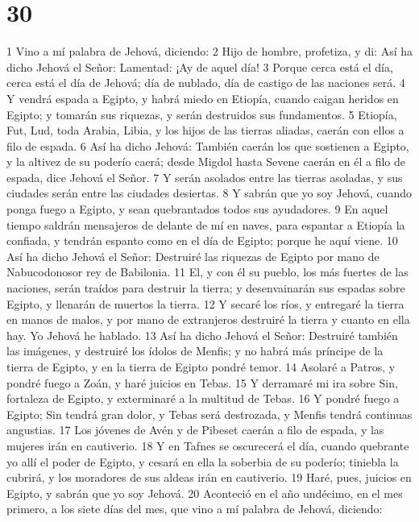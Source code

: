 \chapter{30}

1 Vino a mí palabra de Jehová, diciendo:
2 Hijo de hombre, profetiza, y di: Así ha dicho Jehová el Señor: Lamentad: ¡Ay de aquel día!
3 Porque cerca está el día, cerca está el día de Jehová; día de nublado, día de castigo de las naciones será.
4 Y vendrá espada a Egipto, y habrá miedo en Etiopía, cuando caigan heridos en Egipto; y tomarán sus riquezas, y serán destruidos sus fundamentos.
5 Etiopía, Fut, Lud, toda Arabia, Libia, y los hijos de las tierras aliadas, caerán con ellos a filo de espada.
6 Así ha dicho Jehová: También caerán los que sostienen a Egipto, y la altivez de su poderío caerá; desde Migdol hasta Sevene caerán en él a filo de espada, dice Jehová el Señor.
7 Y serán asolados entre las tierras asoladas, y sus ciudades serán entre las ciudades desiertas.
8 Y sabrán que yo soy Jehová, cuando ponga fuego a Egipto, y sean quebrantados todos sus ayudadores.
9 En aquel tiempo saldrán mensajeros de delante de mí en naves, para espantar a Etiopía la confiada, y tendrán espanto como en el día de Egipto; porque he aquí viene.
10 Así ha dicho Jehová el Señor: Destruiré las riquezas de Egipto por mano de Nabucodonosor rey de Babilonia.
11 El, y con él su pueblo, los más fuertes de las naciones, serán traídos para destruir la tierra; y desenvainarán sus espadas sobre Egipto, y llenarán de muertos la tierra.
12 Y secaré los ríos, y entregaré la tierra en manos de malos, y por mano de extranjeros destruiré la tierra y cuanto en ella hay. Yo Jehová he hablado.
13 Así ha dicho Jehová el Señor: Destruiré también las imágenes, y destruiré los ídolos de Menfis; y no habrá más príncipe de la tierra de Egipto, y en la tierra de Egipto pondré temor.
14 Asolaré a Patros, y pondré fuego a Zoán, y haré juicios en Tebas.
15 Y derramaré mi ira sobre Sin, fortaleza de Egipto, y exterminaré a la multitud de Tebas.
16 Y pondré fuego a Egipto; Sin tendrá gran dolor, y Tebas será destrozada, y Menfis tendrá continuas angustias.
17 Los jóvenes de Avén y de Pibeset caerán a filo de espada, y las mujeres irán en cautiverio.
18 Y en Tafnes se oscurecerá el día, cuando quebrante yo allí el poder de Egipto, y cesará en ella la soberbia de su poderío; tiniebla la cubrirá, y los moradores de sus aldeas irán en cautiverio.
19 Haré, pues, juicios en Egipto, y sabrán que yo soy Jehová.
20 Aconteció en el año undécimo, en el mes primero, a los siete días del mes, que vino a mí palabra de Jehová, diciendo:
